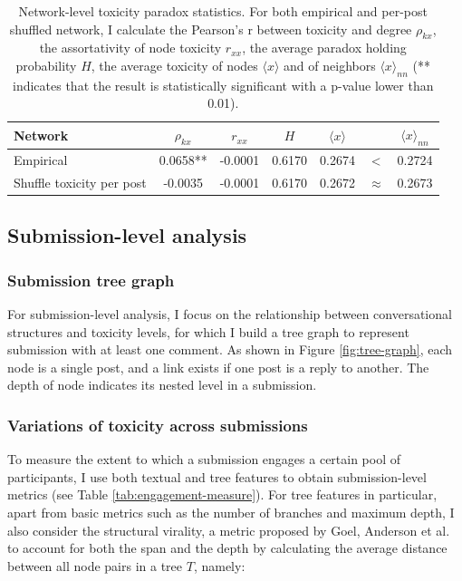 \documentclass[10pt,twocolumn,letterpaper]{article}
\begin{document}
\begin{table}[ht]
\centering
\begin{tabular}{l|cccccc}
Network                   & $\rho_{kx}$ & $r_{xx}$ & $H$    & $\langle x \rangle$ &             & $\langle x \rangle_{nn}$ \\ \hline
Empirical                 & 0.0658**    & -0.0001  & 0.6170 & 0.2674              & \textless{} & 0.2724                 \\
Shuffle toxicity per post & -0.0035     & -0.0001  & 0.6170 & 0.2672              & $\approx$   & 0.2673                
\end{tabular}
\caption{Network-level toxicity paradox statistics. For both empirical and per-post shuffled network, I calculate the Pearson's r between toxicity and degree $\rho_{kx}$, the assortativity of node toxicity $r_{xx}$, the average paradox holding probability $H$, the average toxicity of nodes $\langle x \rangle$ and of neighbors $\langle x \rangle_{nn}$ (** indicates that the result is statistically significant with a p-value lower than 0.01).}
\label{tab:nw-tp}
\end{table}

\subsection{Submission-level analysis}

\subsubsection{Submission tree graph}
For submission-level analysis, I focus on the relationship between conversational structures and toxicity levels, for which I build a tree graph to represent submission with at least one comment. As shown in Figure \ref{fig:tree-graph}, each node is a single post, and a link exists if one post is a reply to another. The depth of node indicates its nested level in a submission. 

\subsubsection{Variations of toxicity across submissions}

To measure the extent to which a submission engages a certain pool of participants, I use both textual and tree features to obtain submission-level metrics (see Table \ref{tab:engagement-measure}). For tree features in particular, apart from basic metrics such as the number of branches and maximum depth, I also consider the structural virality, a metric proposed by Goel, Anderson et al. \cite{goel2016structural} to account for both the span and the depth by calculating the average distance between all node pairs in a tree $T$, namely:
\end{document}
